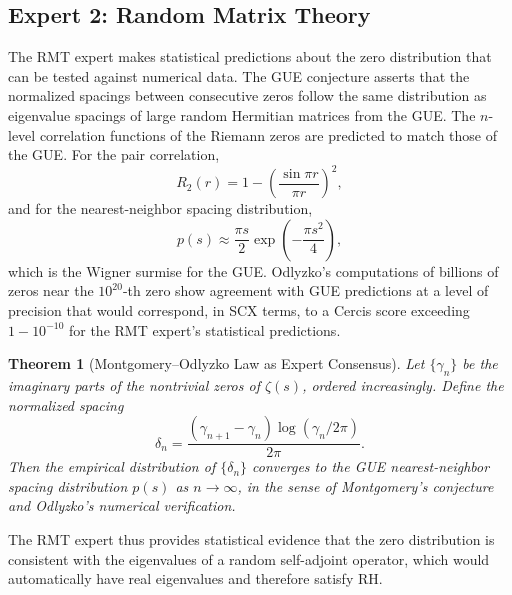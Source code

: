 \documentclass[12pt,a4paper]{article}
\newtheorem{theorem}{Theorem}[section]
\theoremstyle{remark}
\begin{document}
\subsection{Expert 2: Random Matrix Theory}
\label{sec:expert2}
The RMT expert makes statistical predictions about the zero distribution
that can be tested against numerical data. The GUE conjecture
\cite{Montgomery1973, Odlyzko1987, KatzSarnak1999} asserts that the
normalized spacings between consecutive zeros follow the same distribution
as eigenvalue spacings of large random Hermitian matrices from the GUE.
The $n$-level correlation functions of the Riemann zeros are predicted to
match those of the GUE. For the pair correlation,
\[
R_2(r) = 1 - \left(\frac{\sin \pi r}{\pi r}\right)^2,
\]
and for the nearest-neighbor spacing distribution,
\[
p(s) \approx \frac{\pi s}{2} \exp\!\left(-\frac{\pi s^2}{4}\right),
\]
which is the Wigner surmise for the GUE.
Odlyzko's computations \cite{Odlyzko1987, Odlyzko1992} of billions of zeros
near the $10^{20}$-th zero show agreement with GUE predictions at a level
of precision that would correspond, in SCX terms, to a Cercis score
exceeding $1 - 10^{-10}$ for the RMT expert's statistical predictions.
\begin{theorem}[Montgomery--Odlyzko Law as Expert Consensus]
\label{thm:mo_law}
Let $\{ \gamma_n \}$ be the imaginary parts of the nontrivial zeros of
$\zeta(s)$, ordered increasingly. Define the normalized spacing
\[
\delta_n = \frac{(\gamma_{n+1} - \gamma_n)\log(\gamma_n/2\pi)}{2\pi}.
\]
Then the empirical distribution of $\{\delta_n\}$ converges to the GUE
nearest-neighbor spacing distribution $p(s)$ as $n \to \infty$, in the
sense of Montgomery's conjecture and Odlyzko's numerical verification.
\end{theorem}
The RMT expert thus provides statistical evidence that the zero distribution
is consistent with the eigenvalues of a random self-adjoint operator, which
would automatically have real eigenvalues and therefore satisfy RH.
\end{document}
